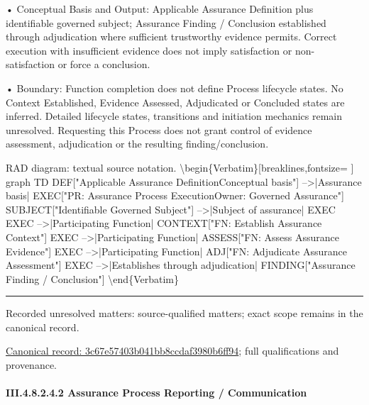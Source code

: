•
Conceptual Basis and Output: Applicable Assurance Definition plus identifiable governed subject; Assurance Finding / Conclusion established through adjudication where sufficient trustworthy evidence permits. Correct execution with insufficient evidence does not imply satisfaction or non-satisfaction or force a conclusion.



•
Boundary: Function completion does not define Process lifecycle states. No Context Established, Evidence Assessed, Adjudicated or Concluded states are inferred. Detailed lifecycle states, transitions and initiation mechanics remain unresolved. Requesting this Process does not grant control of evidence assessment, adjudication or the resulting finding/conclusion.



RAD diagram: textual source notation.
\textbackslash{}begin\{Verbatim\}[breaklines,fontsize=
]
graph TD
    DEF["Applicable Assurance Definition\newline{}Conceptual basis"] -->|Assurance basis| EXEC["PR: Assurance Process Execution\newline{}Owner: Governed Assurance"]
    SUBJECT["Identifiable Governed Subject"] -->|Subject of assurance| EXEC
    EXEC -->|Participating Function| CONTEXT["FN: Establish Assurance Context"]
    EXEC -->|Participating Function| ASSESS["FN: Assess Assurance Evidence"]
    EXEC -->|Participating Function| ADJ["FN: Adjudicate Assurance Assessment"]
    EXEC -->|Establishes through adjudication| FINDING["Assurance Finding / Conclusion"]
\textbackslash{}end\{Verbatim\}



\medskip\hrule\medskip

{\small Recorded unresolved matters: source-qualified matters; exact scope remains in the canonical record.}\par
{\footnotesize \href{../../../../../../../../continuum/business/business-process/3c67e57403b041bb8ccdaf3980b6ff94.md}{Canonical record: 3c67e57403b041bb8ccdaf3980b6ff94}; full qualifications and provenance.}\par
\paragraph*{III.4.8.2.4.2 Assurance Process Reporting / Communication}
\label{navigation:III.4.8.2.4.2}

